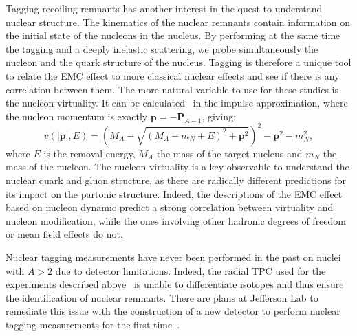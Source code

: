 Tagging recoiling remnants has another interest in the quest to understand nuclear structure.
The kinematics of the nuclear remnants contain information on the
initial state of the nucleons in the nucleus. By performing at the same time the 
tagging and a deeply inelastic scattering, we probe simultaneously the nucleon and the 
quark structure of the nucleus. Tagging is therefore a unique tool to relate the EMC
effect to more classical nuclear effects and see if there is any correlation between
them. The more natural variable to use for these studies is the nucleon virtuality.
It can be calculated~\cite{CiofidegliAtti:2007ork} in the impulse 
approximation, where the nucleon momentum is exactly $\mathbf{p} = -\mathbf{P}_{A-1}$, 
giving:
\begin{equation}
v(|\mathbf{p}|, E) = \left (M_A - \sqrt{(M_A - m_N + E)^2 + \mathbf{p}^2} \right )^2 
                   - \mathbf{p}^2 - m_N^2,
\end{equation} 
where $E$ is the removal energy, $M_A$ the mass of the target nucleus
and $m_N$ the mass of the nucleon. The nucleon virtuality is a key 
observable to understand the nuclear quark and gluon structure,
as there are radically different predictions for its impact on the partonic structure.
Indeed, the descriptions of the EMC effect based on nucleon dynamic 
predict a strong correlation between virtuality and nucleon modification,
while the ones involving other hadronic degrees of 
freedom or mean field effects do not. 

Nuclear tagging measurements have never been performed in the past
on nuclei with $A>2$ due to detector limitations. Indeed, the radial TPC used 
for the experiments described above~\cite{Baillie:2011za}
is unable to differentiate isotopes and thus ensure the identification of 
nuclear remnants. There are plans at Jefferson Lab to remediate this issue
with the construction of a new detector to perform nuclear tagging measurements 
for the first time~\cite{Armstrong:2017zqr,Armstrong:2017zcm}.

